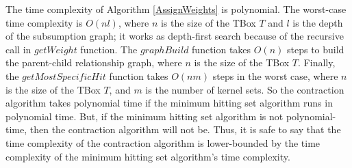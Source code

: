The time complexity of Algorithm \ref{AssignWeights} is polynomial. The worst-case time complexity is $O(nl)$, where $n$ is the size of the TBox $T$ and $l$ is the depth of the subsumption graph; it works as depth-first search because of the recursive call in $getWeight$ function. The $graphBuild$ function takes $O(n)$ steps to build the parent-child relationship graph, where $n$ is the size of the TBox $T$. Finally, the $getMostSpecificHit$ function takes $O(nm)$ steps in the worst case, where $n$ is the size of the TBox $T$, and $m$ is the number of kernel sets. So the contraction algorithm takes polynomial time if the minimum hitting set algorithm runs in polynomial time. But, if the minimum hitting set algorithm is not polynomial-time, then the contraction algorithm will not be. Thus, it is safe to say that the time complexity of the contraction algorithm is lower-bounded by the time complexity of the minimum hitting set algorithm's time complexity.